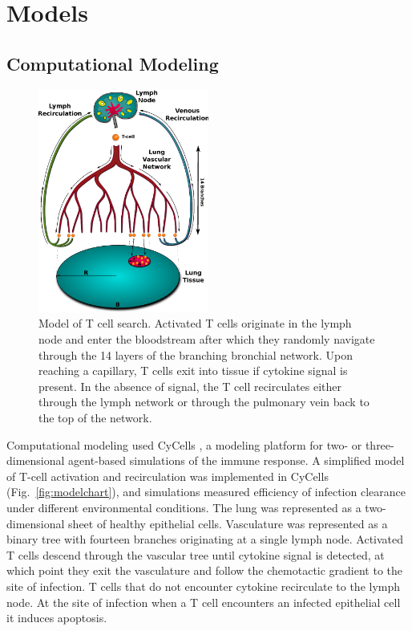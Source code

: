 \documentclass[10pt]{article}
\begin{document}
\section*{Models}


\subsection*{Computational Modeling}

\begin{figure}[ht!]
\begin{center}
\includegraphics[width=0.5\textwidth]{SystemChart}
\end{center}
\caption{Model of T cell search.  Activated T cells originate in the lymph node and enter the bloodstream after which they randomly navigate through the 14 layers of the branching bronchial network.  Upon reaching a capillary, T cells exit into tissue if cytokine signal is present.  In the absence of signal, the T cell recirculates either through the lymph network or through the pulmonary vein back to the top of the network.}
\label{fig:systemchart}
\end{figure}

Computational modeling used CyCells \cite{Warrender2006}, a modeling platform for two- or three-dimensional agent-based simulations of the immune response. A simplified model of T-cell activation and recirculation was implemented in CyCells (Fig.~\ref{fig:modelchart}), and simulations measured efficiency of infection clearance under different environmental conditions. The lung was represented as a two-dimensional sheet of healthy epithelial cells. Vasculature was represented as a binary tree with fourteen branches originating at a single lymph node. Activated T cells descend through the vascular tree until cytokine signal is detected, at which point they exit the vasculature and follow the chemotactic gradient to the site of infection. T cells that do not encounter cytokine recirculate to the lymph node. At the site of infection when a T cell encounters an infected epithelial cell it induces apoptosis.
\end{document}
